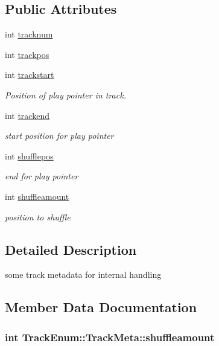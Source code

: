 \subsection*{Public Attributes}
\begin{DoxyCompactItemize}
\item 
int \hyperlink{structTrackEnum_1_1TrackMeta_ad46ff097f05c6c099c60f2274ecb8809}{tracknum}
\item 
int \hyperlink{structTrackEnum_1_1TrackMeta_a5f6e9b4f14d0909232d66fa239d4c599}{trackpos}
\item 
int \hyperlink{structTrackEnum_1_1TrackMeta_ab3e1eb6af3878c93058f8e1f605a04ca}{trackstart}
\begin{DoxyCompactList}\small\item\em Position of play pointer in track. \end{DoxyCompactList}\item 
int \hyperlink{structTrackEnum_1_1TrackMeta_a30ae4258c286830c56687282f5f340e0}{trackend}
\begin{DoxyCompactList}\small\item\em start position for play pointer \end{DoxyCompactList}\item 
int \hyperlink{structTrackEnum_1_1TrackMeta_a1997282ab24eb2e282c3752cb1e6d265}{shufflepos}
\begin{DoxyCompactList}\small\item\em end for play pointer \end{DoxyCompactList}\item 
int \hyperlink{structTrackEnum_1_1TrackMeta_a3d236071608831996ac6c48401b8aa53}{shuffleamount}
\begin{DoxyCompactList}\small\item\em position to shuffle \end{DoxyCompactList}\end{DoxyCompactItemize}


\subsection{Detailed Description}
some track metadata for internal handling 

\subsection{Member Data Documentation}
\hypertarget{structTrackEnum_1_1TrackMeta_a3d236071608831996ac6c48401b8aa53}{
\subsubsection[{shuffleamount}]{\setlength{\rightskip}{0pt plus 5cm}int Track\-Enum\-::\-Track\-Meta\-::shuffleamount}}\label{structTrackEnum_1_1TrackMeta_a3d236071608831996ac6c48401b8aa53}


